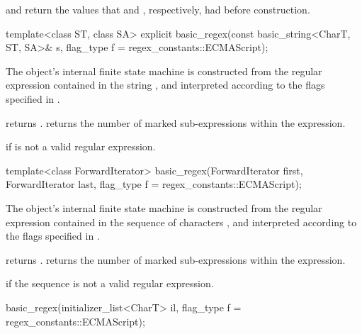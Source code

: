 \begin{itemdescr}
\pnum
\ensures
{} and  return the values that
 and , respectively, had before construction.
\end{itemdescr}

%
\begin{itemdecl}
template<class ST, class SA>
  explicit basic_regex(const basic_string<CharT, ST, SA>& s,
                       flag_type f = regex_constants::ECMAScript);
\end{itemdecl}

\begin{itemdescr}
\pnum
\effects
The object's internal finite state machine
is constructed from the regular expression contained in
the string , and
interpreted according to the flags specified in .

\pnum
\ensures
{} returns .
 returns the number of marked sub-expressions
within the expression.

\pnum
\throws
{} if  is not a valid regular expression.
\end{itemdescr}

%
\begin{itemdecl}
template<class ForwardIterator>
  basic_regex(ForwardIterator first, ForwardIterator last,
              flag_type f = regex_constants::ECMAScript);
\end{itemdecl}

\begin{itemdescr}
\pnum
\effects
The object's internal finite state machine
is constructed from the regular expression contained in
the sequence of characters , and
interpreted according to the flags specified in .

\pnum
\ensures
{} returns .
 returns the number of marked sub-expressions
within the expression.

\pnum
\throws
{} if the sequence  is not a
valid regular expression.
\end{itemdescr}

%
\begin{itemdecl}
basic_regex(initializer_list<CharT> il, flag_type f = regex_constants::ECMAScript);
\end{itemdecl}

